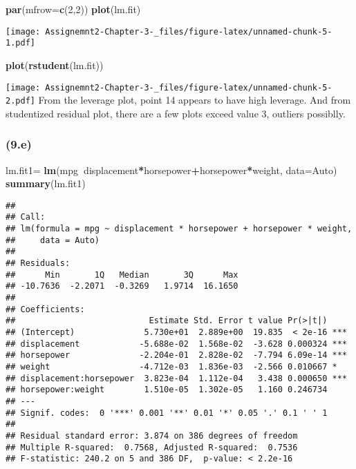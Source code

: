 \documentclass[]{article}
\newenvironment{Shaded}{\begin{snugshade}}{\end{snugshade}}
\newcommand{\DataTypeTok}[1]{\textcolor[rgb]{0.13,0.29,0.53}{#1}}
\newcommand{\DecValTok}[1]{\textcolor[rgb]{0.00,0.00,0.81}{#1}}
\newcommand{\KeywordTok}[1]{\textcolor[rgb]{0.13,0.29,0.53}{\textbf{#1}}}
\newcommand{\NormalTok}[1]{#1}
\newcommand{\OperatorTok}[1]{\textcolor[rgb]{0.81,0.36,0.00}{\textbf{#1}}}
\newcommand{\StringTok}[1]{\textcolor[rgb]{0.31,0.60,0.02}{#1}}
\begin{document}
\begin{Shaded}
\begin{Highlighting}[]
\KeywordTok{par}\NormalTok{(}\DataTypeTok{mfrow=}\KeywordTok{c}\NormalTok{(}\DecValTok{2}\NormalTok{,}\DecValTok{2}\NormalTok{))}
\KeywordTok{plot}\NormalTok{(lm.fit)}
\end{Highlighting}
\end{Shaded}

\texttt{[image: Assignemnt2-Chapter-3-\_files/figure-latex/unnamed-chunk-5-1.pdf]}

\begin{Shaded}
\begin{Highlighting}[]
\KeywordTok{plot}\NormalTok{(}\KeywordTok{rstudent}\NormalTok{(lm.fit))}
\end{Highlighting}
\end{Shaded}

\texttt{[image: Assignemnt2-Chapter-3-\_files/figure-latex/unnamed-chunk-5-2.pdf]}
From the leverage plot, point 14 appears to have high leverage. And from
studentized residual plot, there are a few plots exceed value 3,
outliers possiblly.

\hypertarget{e}{%
\subsubsection{(9.e)}\label{e}}

\begin{Shaded}
\begin{Highlighting}[]
\NormalTok{lm.fit1=}\StringTok{ }\KeywordTok{lm}\NormalTok{(mpg}\OperatorTok{~}\NormalTok{displacement}\OperatorTok{*}\NormalTok{horsepower}\OperatorTok{+}\NormalTok{horsepower}\OperatorTok{*}\NormalTok{weight, }\DataTypeTok{data=}\NormalTok{Auto)}
\KeywordTok{summary}\NormalTok{(lm.fit1)}
\end{Highlighting}
\end{Shaded}

\begin{verbatim}
## 
## Call:
## lm(formula = mpg ~ displacement * horsepower + horsepower * weight, 
##     data = Auto)
## 
## Residuals:
##      Min       1Q   Median       3Q      Max 
## -10.7636  -2.2071  -0.3269   1.9714  16.1650 
## 
## Coefficients:
##                           Estimate Std. Error t value Pr(>|t|)    
## (Intercept)              5.730e+01  2.889e+00  19.835  < 2e-16 ***
## displacement            -5.688e-02  1.568e-02  -3.628 0.000324 ***
## horsepower              -2.204e-01  2.828e-02  -7.794 6.09e-14 ***
## weight                  -4.712e-03  1.836e-03  -2.566 0.010667 *  
## displacement:horsepower  3.823e-04  1.112e-04   3.438 0.000650 ***
## horsepower:weight        1.510e-05  1.302e-05   1.160 0.246734    
## ---
## Signif. codes:  0 '***' 0.001 '**' 0.01 '*' 0.05 '.' 0.1 ' ' 1
## 
## Residual standard error: 3.874 on 386 degrees of freedom
## Multiple R-squared:  0.7568, Adjusted R-squared:  0.7536 
## F-statistic: 240.2 on 5 and 386 DF,  p-value: < 2.2e-16
\end{verbatim}
\end{document}
